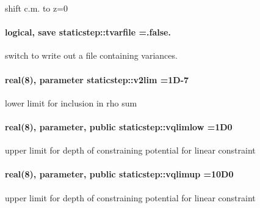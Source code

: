 shift c.\+m. to z=0 

\paragraph[{\texorpdfstring{tvarfile}{tvarfile}}]{\setlength{\rightskip}{0pt plus 5cm}logical, save staticstep\+::tvarfile =.false.\hspace{0.3cm}{\ttfamily [private]}}\hypertarget{namespacestaticstep_ac12060bc672bbf63f1d4c9aaee259595}{}\label{namespacestaticstep_ac12060bc672bbf63f1d4c9aaee259595}


switch to write out a file containing variances. 

\paragraph[{\texorpdfstring{v2lim}{v2lim}}]{\setlength{\rightskip}{0pt plus 5cm}real(8), parameter staticstep\+::v2lim =1\+D-\/7\hspace{0.3cm}{\ttfamily [private]}}\hypertarget{namespacestaticstep_a1b09ef2334c64437644701c17a440ca5}{}\label{namespacestaticstep_a1b09ef2334c64437644701c17a440ca5}


lower limit for inclusion in \textquotesingle{}rho\textquotesingle{} sum 

\paragraph[{\texorpdfstring{vqlimlow}{vqlimlow}}]{\setlength{\rightskip}{0pt plus 5cm}real(8), parameter, public staticstep\+::vqlimlow =1\+D0}\hypertarget{namespacestaticstep_ae5b772f9920183fe3d5d039a8d9d8572}{}\label{namespacestaticstep_ae5b772f9920183fe3d5d039a8d9d8572}


upper limit for depth of constraining potential for linear constraint 

\paragraph[{\texorpdfstring{vqlimup}{vqlimup}}]{\setlength{\rightskip}{0pt plus 5cm}real(8), parameter, public staticstep\+::vqlimup =10\+D0}\hypertarget{namespacestaticstep_a2e05c48e66e07d84c7085d757222c663}{}\label{namespacestaticstep_a2e05c48e66e07d84c7085d757222c663}


upper limit for depth of constraining potential for linear constraint 

